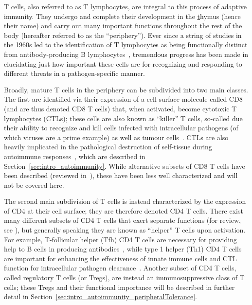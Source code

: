 T cells, also referred to as T lymphocytes, are integral to this process of adaptive immunity. They undergo and complete their development in the \underline{t}hymus (hence their name) and carry out many important functions throughout the rest of the body (hereafter referred to as the ``periphery''). Ever since a string of studies in the 1960s led to the identification of T lymphocytes as being functionally distinct from antibody-producing B lymphocytes~\cite{mitchell1968immunological,miller1968cell,mitchell1968cell,miller2011golden}, tremendous progress has been made in elucidating just how important these cells are for recognizing and responding to different threats in a pathogen-specific manner.

Broadly, mature T cells in the periphery can be subdivided into two main classes. The first are identified via their expression of a cell surface molecule called CD8 (and are thus denoted CD8\pos{} T cells) that, when activated, become cytotoxic T lymphocytes (CTLs); these cells are also known as ``killer” T cells, so-called due their ability to recognize and kill cells infected with intracellular pathogens (of
which viruses are a prime example) as well as tumour cells~\cite{townsend1985cytotoxic,masopust2007brief,raskov2021cytotoxic,tian2022ctls}. CTLs are also heavily implicated in the pathological destruction of self-tissue during autoimmune responses~\cite{liblau2002autoreactive,walter2005cd8+}, which are described in Section~\ref{sec:intro_autoimmunity}. While alternative subsets of CD8\pos{} T cells have been described (reviewed in~\cite{mittrucker2014heterogeneity}), these have been less well characterized and will not be covered here.

The second main subdivision of T cells is instead characterized by the expression of CD4 at their cell surface; they are therefore denoted CD4\pos{} T cells. There exist many different subsets of CD4\pos{} T cells that exert separate functions (for review, see \cite{raphael2015t}), but generally speaking they are known as ``helper” T cells upon activation. For example, T-follicular helper (Tfh) CD4\pos{} T cells are necessary for providing help to B cells in producing antibodies~\cite{victora2012germinal,crotty2014t,crotty2015brief}, while type 1 helper (Th1) CD4\pos{} T cells are important for enhancing the effectiveness of innate immune cells and CTL function for intracellular pathogen clearance~\cite{del1991purified,raphael2015t,ditoro2021emerging}. Another subset of CD4\pos{} T cells, called regulatory T cells (or Tregs), are instead an immunosuppressive class of T cells; these Tregs and their functional importance will be described in further detail in Section~\ref{sec:intro_autoimmunity_peripheralTolerance}.

